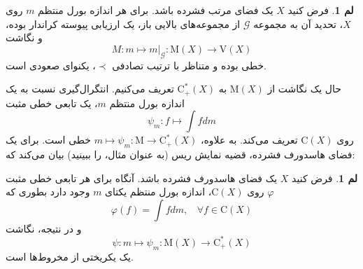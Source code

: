 \documentclass[12pt,a4paper]{article}
\theoremstyle{definition}
\theoremstyle{theorem}
\newtheorem{lemma}[definition]{لم}
\theoremstyle{definition}
\newcommand{\cG}{\mathcal{G}}
\newcommand{\rM}{\mathrm{M}}
\newcommand{\rC}{\mathrm{C}}
\begin{document}
\begin{lemma}
فرض کنید
$ X$
یک فضای مرتب فشرده باشد.  برای هر اندازه بورل منتظم 
$ m $
روی 
$ X $،  تحدید آن به مجموعه
$ \cG $
از مجموعه‌های بالایی باز، یک ارزیابی پیوسته کراندار بوده،  و نگاشت
$$ M:m\mapsto  m|_{\cG}:\rM(X)\rightarrow \mathrm{V}(X)$$
خطی بوده و متناظر با ترتیب تصادفی 
$ \prec $،  یکنوای صعودی   است.
\end{lemma}
حال یک نگاشت از 
$ \rM(X) $
به 
$ \rC_{+}^{*}(X) $
تعریف می‌کنیم.  انتگرال‌گیری نسبت به یک اندازه بورل منتظم 
$ m $،  یک تابعی خطی مثبت 
$$ \psi_{m}:f\mapsto \int{f}dm $$
روی 
$ \rC(X) $
تعریف می‌کند.  به علاوه،  
$ m\mapsto \psi_{m}:\rM\rightarrow \rC_{+}^{*}(X) $
خطی است.  برای یک فضای هاسدورف فشرده،  قضیه نمایش ریس
(به عنوان مثال، 
 \cite{rudin}
را ببینید) بیان می‌کند که:
\begin{lemma}\label{5.2} 
فرض کنید 
$ X $
یک فضای هاسدورف فشرده باشد.  آنگاه برای هر تابعی خطی مثبت 
$ \varphi $
روی 
$ \rC(X) $،  اندازه بورل منتظم یکتای 
$ m $  وجود دارد 
بطوری که 
$$ \varphi(f)=\int{f}dm , \ \ \ \ \forall f\in \rC(X) $$
و در نتیجه،   نگاشت 
$$ \psi:m\mapsto \psi_{m}:\rM(X)\rightarrow \rC_{+}^{*}(X) $$
یک یکریختی از مخروط‌ها است.
\end{lemma}
\end{document}
